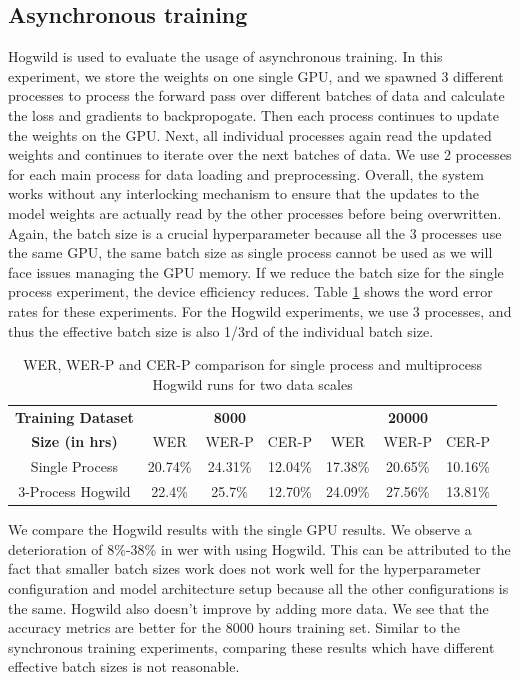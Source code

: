 \subsection{Asynchronous training}
Hogwild \cite{Niu2011HOGWILD:Descent} is used to evaluate the usage of asynchronous training. In this experiment, we store the weights on one single GPU, and we spawned 3 different processes to process the forward pass over different batches of data and calculate the loss and gradients to backpropogate. Then each process continues to update the weights on the GPU. Next, all individual processes again read the updated weights and continues to iterate over the next batches of data. We use 2 processes for each main process for data loading and preprocessing. Overall, the system works without any interlocking mechanism to ensure that the updates to the model weights are actually read by the other processes before being overwritten. Again, the batch size is a crucial hyperparameter because all the 3 processes use the same GPU, the same batch size as single process cannot be used as we will face issues managing the GPU memory. If we reduce the batch size for the single process experiment, the device efficiency reduces. Table \ref{table:wer_hog} shows the word error rates for these experiments. For the Hogwild experiments, we use 3 processes, and thus the effective batch size is also 1/3rd of the individual batch size.

\begin{table}[ht]
\centering
\begin{tabular}{c | c c c | c c c }
\hline
\textbf{Training Dataset} & \multicolumn{3}{c|}{\textbf{8000}} & \multicolumn{3}{c}{\textbf{20000}}\\\cline{2-7}
   \textbf{Size (in hrs)} & WER & WER-P & CER-P & WER & WER-P & CER-P\\
 \hline
  Single Process & 20.74\% & 24.31\% & 12.04\% & 17.38\% & 20.65\% & 10.16\%\\
  3-Process Hogwild & 22.4\% & 25.7\% & 12.70\% & 24.09\% & 27.56\% & 13.81\% \\
 \hline
\end{tabular}
\caption{\label{table:wer_hog} WER, WER-P and CER-P comparison for single process and multiprocess Hogwild runs for two data scales}
\end{table}

We compare the Hogwild results with the single GPU results. We observe a deterioration of 8\%-38\% in \acrshort{wer} with using Hogwild. This can be attributed to the fact that smaller batch sizes work does not work well for the hyperparameter configuration and model architecture setup because all the other configurations is the same. Hogwild also doesn't improve by adding more data. We see that the accuracy metrics are better for the 8000 hours training set. Similar to the synchronous training experiments, comparing these results which have different effective batch sizes is not reasonable. 


